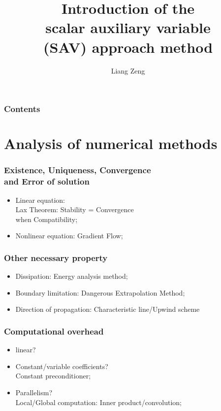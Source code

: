 \documentclass{beamer}
\title{Introduction of the\\ scalar auxiliary variable \\(SAV) approach method}
\author{Liang Zeng}
\begin{document}
\frame{\titlepage}
\begin{frame}
\frametitle{Contents}
  \tableofcontents
\end{frame}
\section{Analysis of numerical methods}

    \begin{frame}
    \frametitle{Existence, Uniqueness, Convergence \\and Error of solution}

	\begin{itemize}
	\item Linear equation: \\
	Lax Theorem: Stability = Convergence\\
	 when Compatibility;
	\item Nonlinear equation: Gradient Flow;
	\end{itemize}
	
    \end{frame}
    \begin{frame}
    \frametitle{Other necessary property}
    \begin{itemize}
    \item Dissipation: Energy analysis method;
    \item Boundary limitation: Dangerous Extrapolation Method;
    \item Direction of propagation: Characteristic line/Upwind scheme
    \end{itemize}

    \end{frame}

    \begin{frame}
    \frametitle{Computational overhead}
\begin{itemize}
\item linear?
\item Constant/variable coefficients?\\
Constant preconditioner;
\item Parallelism?\\
Local/Global computation: Inner product/convolution;
\end{itemize}

    \end{frame}
\end{document}

